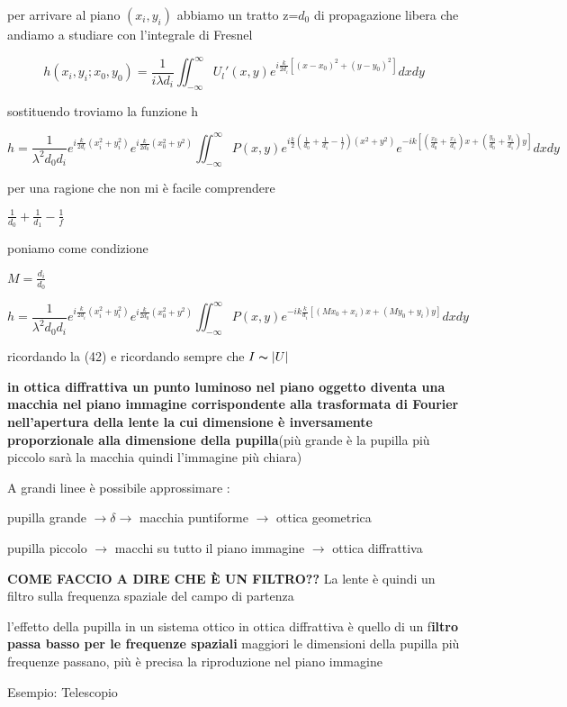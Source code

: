\documentclass{article}
\begin{document}
per arrivare al piano $(x_{i}, y_{i})$ abbiamo un tratto z=$d_{0}$ di propagazione libera che andiamo a studiare con l'integrale di Fresnel

\begin{equation}
h(x_{i}, y_{i}; x_{0}, y_{0})= \frac{1}{ i \lambda d_{i}} \iint_{-\infty}^{\infty} U_{l}' (x,y) e^{i \frac{k}{2 d_{i}}[(x-x_{0})^{2} +(y-y_{0})^{2}]}dxdy
\end{equation}


sostituendo troviamo la funzione h

\begin{equation}
h= \frac{1}{\lambda^{2} d_{0} d_{i}} e ^{i \frac{k}{2 d_{i}}(x_{i}^{2}+y_{i}^{2})} e ^{i \frac{k}{2 d_{0}}(x_{0}^{2}+y_{}^{2})} \iint_{-\infty}^{\infty} P(x,y) e^{i \frac{k}{2}  (\frac{1}{d_{0}} + \frac{1}{d_{1}} - \frac{1}{f})(x^{2}+y^{2}) } e^{- i k [(\frac{x_{0}}{d_{0}} + \frac{x_{1}}{d_{1}} ) x + (\frac{y_{0}}{d_{0}} + \frac{y_{1}}{d_{1}} ) y]} dxdy
\end{equation}


per una ragione che non mi è facile comprendere 

$\frac{1}{d_{0}}+ \frac{1}{d_{1}} - \frac{1}{f}$

poniamo come condizione

$M = \frac{d_{i}}{d_{0}}$

\begin{equation}
h= \frac{1}{\lambda^{2} d_{0} d_{i}} e ^{i \frac{k}{2 d_{i}}(x_{i}^{2}+y_{i}^{2})} e ^{i \frac{k}{2 d_{0}}(x_{0}^{2}+y_{}^{2})} \iint_{-\infty}^{\infty} P(x,y)  e^{- i k \frac{k}{d_{i}} [(M x_{0} + x_{i}) x + (M y_{0} + y_{i})y]} dxdy
\end{equation}

ricordando la (42)  e ricordando sempre che $ I \thicksim |U|$


\textbf{in ottica diffrattiva un punto luminoso nel piano oggetto diventa una macchia nel piano immagine corrispondente alla trasformata di Fourier nell'apertura della lente la cui dimensione è inversamente proporzionale alla dimensione della pupilla}(più grande è la pupilla più piccolo sarà la macchia quindi l'immagine più chiara)


A grandi linee è possibile approssimare :

pupilla grande $\rightarrow \delta \rightarrow$ macchia puntiforme $\rightarrow$ ottica geometrica

pupilla piccolo $\rightarrow$ macchi su tutto il piano immagine $\rightarrow$ ottica diffrattiva 

\textbf{COME FACCIO A DIRE CHE È UN FILTRO??}
La lente è quindi un filtro sulla frequenza spaziale del campo di partenza 

l'effetto della pupilla in un sistema ottico in ottica diffrattiva è quello di un f\textbf{iltro passa basso per le frequenze spaziali} maggiori le dimensioni della pupilla più frequenze passano, più è precisa la riproduzione nel piano immagine

Esempio: Telescopio

 
\end{document}
